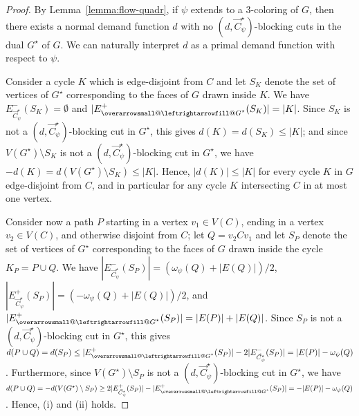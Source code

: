 \documentclass[12pt,twoside,openright,a4paper]{book}
\makeatletter
\newcommand{\ovlr}{\mathpalette{\overarrowsmall@\leftrightarrowfill@}}
\newcommand{\overarrowsmall@}[3]{%
  \vbox{%
    \ialign{%
      ##\crcr
      #1{\smaller@style{#2}}\crcr
      \noalign{\nointerlineskip}%
      $\m@th\hfil#2#3\hfil$\crcr
    }%
  }%
}
\def\smaller@style#1{%
  \ifx#1\displaystyle\scriptstyle\else
    \ifx#1\textstyle\scriptstyle\else
      \scriptscriptstyle
    \fi
  \fi
}
\makeatother
\begin{document}
\begin{proof}
By Lemma~\ref{lemma:flow-quadr}, if $\psi$ extends to a $3$-coloring of $G$, then
there exists a normal demand function $d$ with no $(d,\vec{C}^\star_\psi)$-blocking cuts in the dual $G^\star$ of $G$.
We can naturally interpret $d$ as a primal demand function with respect to $\psi$.

Consider a cycle $K$ which is edge-disjoint from $C$ and let $S_K$ denote the set of vertices of $G^\star$
corresponding to the faces of $G$ drawn inside $K$.  We have $E_{\vec{C}^\star_\psi}^-(S_K)=\emptyset$ and $|E_{\ovlr{G^\star}}^+(S_K)|=|K|$.
Since $S_K$ is not a $(d,\vec{C}^\star_\psi)$-blocking cut in $G^\star$, this gives $d(K)=d(S_K)\le |K|$;
and since $V(G^\star)\setminus S_K$ is not a $(d,\vec{C}^\star_\psi)$-blocking cut in $G^\star$, we have $-d(K)=d(V(G^\star)\setminus S_K)\le |K|$.
Hence, $|d(K)|\le |K|$ for every cycle $K$ in $G$ edge-disjoint from $C$, and in particular for any cycle $K$ intersecting $C$ in at most one vertex.

Consider now a path $P$ starting in a vertex $v_1\in V(C)$, ending in a vertex $v_2\in V(C)$, and otherwise disjoint from $C$;
let $Q=v_2Cv_1$ and let $S_P$ denote the set of vertices of $G^\star$ corresponding to the faces of $G$ drawn inside the cycle $K_P=P\cup Q$.
We have $|E_{\vec{C}^\star_\psi}^-(S_P)|=(\omega_\psi(Q)+|E(Q)|)/2$, $|E_{\vec{C}^\star_\psi}^+(S_P)|=(-\omega_\psi(Q)+|E(Q)|)/2$, and
$|E_{\ovlr{G^\star}}^+(S_P)|=|E(P)|+|E(Q)|$.
Since $S_P$ is not a $(d,\vec{C}^\star_\psi)$-blocking cut in $G^\star$, this gives
$d(P\cup Q)=d(S_P)\le |E_{\ovlr{G^\star}}^+(S_P)|-2|E_{\vec{C}^\star_\psi}^-(S_P)|=|E(P)|-\omega_\psi(Q)$.
Furthermore, since $V(G^\star)\setminus S_P$ is not a $(d,\vec{C}^\star_\psi)$-blocking cut in $G^\star$, we have
$d(P\cup Q)=-d(V(G^\star)\setminus S_P)\ge 2|E_{\vec{C}^\star_\psi}^+(S_P)|-|E_{\ovlr{G^\star}}^+(S_P)|=-|E(P)|-\omega_\psi(Q)$.
Hence, (i) and (ii) holds.


\end{proof}
\end{document}
